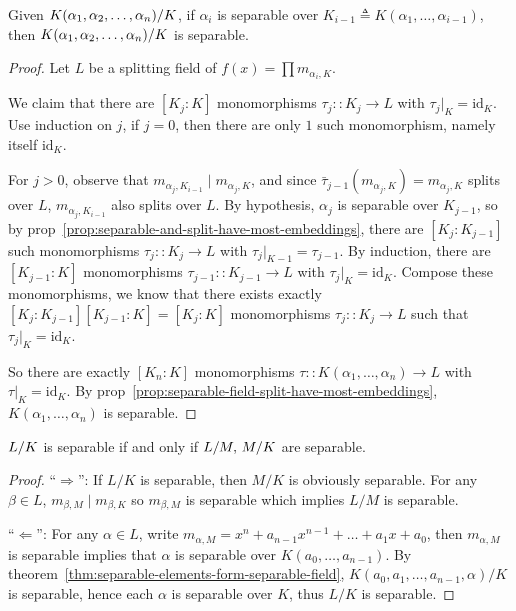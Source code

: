 \begin{theorem} \label{thm:separable-elements-form-separable-field}
  Given ${K(\alpha_1, \alpha_2, \dots, \alpha_n)}/{K}$, if $\alpha_i$ is
  separable over $K_{i-1} \triangleq K(\alpha_1, \dots, \alpha_{i-1})$, then
  ${K(\alpha_1, \alpha_2, \dots, \alpha_n)}/{K}$ is separable.

  \begin{proof}
    Let $L$ be a splitting field of $f(x) = \prod m_{\alpha_i, K}$.

    We claim that there are $[K_j: K]$ monomorphisms $\tau_j:: K_j \to L$ with $\tau_j \big|_K = \text{id}_K$.
    Use induction on $j$, if $j = 0$, then there are only $1$ such monomorphism, namely itself $\text{id}_K$.

    For $j > 0$, observe that $m_{\alpha_j, K_{i-1}} \mid m_{\alpha_j, K}$, and since $\bar\tau_{j-1}
    (m_{\alpha_j, K}) = m_{\alpha_j, K}$ splits over $L$, $m_{\alpha_j, K_{i-1}}$ also splits over $L$.
    By hypothesis, $\alpha_j$ is separable over $K_{j-1}$, so by prop~\ref{prop:separable-and-split-have-most-embeddings},
    there are $[K_j: K_{j-1}]$ such monomorphisms $\tau_j:: K_j \to L$ with $\tau_j \big|_{K-1} = \tau_{j-1}$.
    By induction, there are $[K_{j-1}: K]$ monomorphisms $\tau_{j-1}:: K_{j-1} \to L$
    with $\tau_j \big|_K = \text{id}_K$. Compose these monomorphisms, we know that there
    exists exactly $[K_j: K_{j-1}][K_{j-1}: K] = [K_j: K]$ monomorphisms $\tau_j:: K_j \to L$ such that
    $\tau_j \big|_K = \text{id}_K$.

    So there are exactly $[K_n: K]$ monomorphisms $\tau :: K(\alpha_1, \dots, \alpha_n) \to L$
    with $\tau\big|_K = \text{id}_K$.
    By prop~\ref{prop:separable-field-split-have-most-embeddings}, $K(\alpha_1, \dots, \alpha_n)$ is separable.

  \end{proof}
\end{theorem}

\begin{theorem}
  ${L}/{K}$ is separable if and only if ${L}/{M},\, {M}/{K}$ are separable.

  \begin{proof}
    ``$\Rightarrow$'': If $L/K$ is separable, then $M/K$ is obviously separable. For any $\beta \in L$,
    $m_{\beta, M} \mid m_{\beta, K}$ so $m_{\beta, M}$ is separable which implies $L/M$ is separable.

    ``$\Leftarrow$'': For any $\alpha \in L$, write $m_{\alpha, M} = x^n + a_{n-1}x^{n-1} + \dots + a_1 x + a_0$,
    then $m_{\alpha, M}$ is separable implies that $\alpha$ is separable over $K(a_0, \dots, a_{n-1})$.
    By theorem~\ref{thm:separable-elements-form-separable-field},
    $K(a_0, a_1, \dots, a_{n-1}, \alpha) / K$ is separable, hence each $\alpha$ is separable over $K$,
    thus $L/K$ is separable.
  \end{proof}
\end{theorem}
